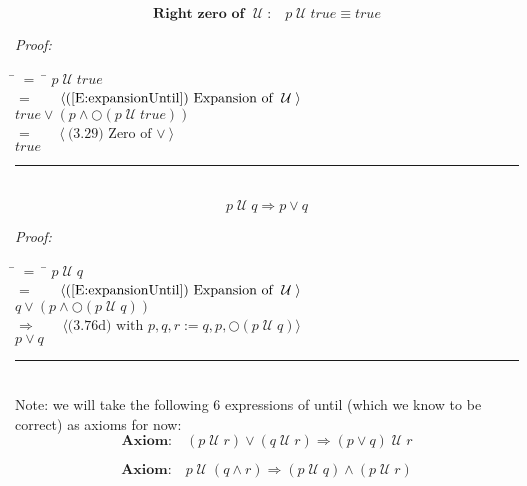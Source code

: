 \documentclass[fleqn, leqno]{article}
\newcommand{\lgap}{2pt}                             %
\newcommand{\mymathindent}{24pt}                      %
\newcommand{\until}{\;\mathcal{U}\;}
\newcommand{\next}{\bigcirc}
\newcommand{\myqed}{\hfill\rule[-.23ex]{1.2ex}{2.0ex}}
\newcommand{\Gll} {\langle}                         %
\newcommand{\Ggg} {\rangle}                         %
\newcommand{\Hint}[1]     {\ \ \ $\Gll              \mbox{#1} \Ggg$ }   %
\begin{document}
\begin{equation}\label{E:zeroUntil}
\textbf{Right zero of $\until$:}\quad p \until true \equiv true
\end{equation}

\emph{Proof:}
\begin{tabbing}
\hspace{\mymathindent} \= $= \;$ \= \kill
  \> \>   $p \until true$\\[\lgap]
  \> $=$  \>  \Hint{(\ref{E:expansionUntil}) Expansion of $\until$}\\[\lgap]
  \> \>   $true \lor (p \land \next(p \until true))$\\[\lgap]
  \> $=$  \>  \Hint{(3.29) Zero of $\lor$}\\[\lgap]
  \> \>   $true$\\[\lgap]
\end{tabbing}
\myqed\\[\lgap]


\begin{equation}\label{E:untilImpOr}
p \until q \Rightarrow p \lor q
\end{equation}

\emph{Proof:}
\begin{tabbing}
\hspace{\mymathindent} \= $= \;$ \= \kill
  \> \>   $p \until q$\\[\lgap]
  \> $=$  \>  \Hint{(\ref{E:expansionUntil}) Expansion of $\until$}\\[\lgap]
  \> \>   $q \lor (p \land \next(p \until q))$\\[\lgap]
  \> $\Rightarrow$  \>  \Hint{(3.76d) with $p,q,r := q,p,\next(p \until q)$}\\[\lgap]
  \> \>   $p \lor q$\\[\lgap]
\end{tabbing}
\myqed\\[\lgap]


Note: we will take the following 6 expressions of until (which we know to be correct) as axioms for now:\\

\begin{equation}\label{E:untilOrImp}
\textbf{Axiom:}\quad (p \until r) \lor (q \until r) \Rightarrow (p \lor q) \until r
\end{equation}

\begin{equation}\label{E:untilAndImp}
\textbf{Axiom:}\quad p \until (q \land r) \Rightarrow (p \until q) \land (p \until r)
\end{equation}
\end{document}
